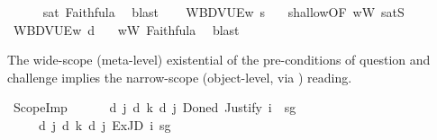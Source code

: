 \begin{isabellebody}
\ \ \ \ \isamarkupfalse%
\ sat\ Faithful{}a\ \isamarkupfalse%
\ blast\isanewline
\ \ \isamarkupfalse%
\ {\isachardoublequoteopen}{\isasymlangle}W{\isacharcomma}{\kern0pt}B{\isacharcomma}{\kern0pt}D{\isacharcomma}{\kern0pt}V{\isacharcomma}{\kern0pt}U{\isacharcomma}{\kern0pt}E{\isasymrangle}{\isacharcomma}{\kern0pt}w\ {\isasymTurnstile}\isactrlsup s\ {\isasymlparr}{\isasymphi}{\isasymrparr}{\isachardoublequoteclose}\ \isamarkupfalse%
\ shallow{\isacharbrackleft}{\kern0pt}OF\ wW\ satS{\isacharbrackright}{\kern0pt}\ \isakeywordONE{{\isachardot}{\kern0pt}}\isamarkupfalse%
\isanewline
\ \ \isamarkupfalse%
\ {\isachardoublequoteopen}{\isasymlangle}W{\isacharcomma}{\kern0pt}B{\isacharcomma}{\kern0pt}D{\isacharcomma}{\kern0pt}V{\isacharcomma}{\kern0pt}U{\isacharcomma}{\kern0pt}E{\isasymrangle}{\isacharcomma}{\kern0pt}w\ {\isasymTurnstile}\isactrlsup d\ {\isasymphi}{\isachardoublequoteclose}\ \isamarkupfalse%
\ wW\ Faithful{}a\ \isamarkupfalse%
\ blast\isanewline
{}\isamarkupfalse%
%
\endisatagproof
{\isafoldproof}%
%
\isadelimproof
%
\endisadelimproof
%
\isadelimdocument
%
\endisadelimdocument
%
\isatagdocument
%
\isamarkuptrue%
%
\endisatagdocument
{\isafolddocument}%
%
\isadelimdocument
%
\endisadelimdocument
%
\begin{isamarkuptext}%
The wide-scope (meta-level) existential of the pre-conditions of question and
challenge implies the narrow-scope (object-level, via ) reading.%
\end{isamarkuptext}\isamarkuptrue%
\isamarkupfalse%
\ ScopeImp{\isacharcolon}{\kern0pt}\isanewline
\ \ \ {\isachardoublequoteopen}{\isasymexists}{\isasymDelta}{\isachardot}{\kern0pt}\ {\isasymGamma}\ {\isasymTurnstile}\ {\isasymD}\isactrlsup d\ j\ {\isacharparenleft}{\kern0pt}{\isasymB}\isactrlsup d\ k\ {\isacharparenleft}{\kern0pt}{\isasymD}\isactrlsup d\ j\ {\isacharparenleft}{\kern0pt}Done\isactrlsup d\ {\isacharparenleft}{\kern0pt}Justify\ i\ {\isasymDelta}\ sg\ {\isasymphi}{\isacharparenright}{\kern0pt}{\isacharparenright}{\kern0pt}{\isacharparenright}{\kern0pt}{\isacharparenright}{\kern0pt}{\isachardoublequoteclose}\isanewline
\ \ \ {\isachardoublequoteopen}{\isasymGamma}\ {\isasymTurnstile}\ {\isasymD}\isactrlsup d\ j\ {\isacharparenleft}{\kern0pt}{\isasymB}\isactrlsup d\ k\ {\isacharparenleft}{\kern0pt}{\isasymD}\isactrlsup d\ j\ {\isacharparenleft}{\kern0pt}ExJD\ i\ sg\ {\isasymphi}{\isacharparenright}{\kern0pt}{\isacharparenright}{\kern0pt}{\isacharparenright}{\kern0pt}{\isachardoublequoteclose}\isanewline

\end{isabellebody}
